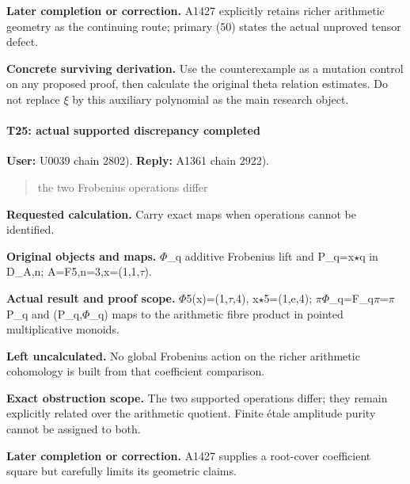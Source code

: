 \textbf{Later completion or correction.} A1427 explicitly retains richer
arithmetic geometry as the continuing route; primary (50) states the
actual unproved tensor defect.

\textbf{Concrete surviving derivation.} Use the counterexample as a
mutation control on any proposed proof, then calculate the original
theta relation estimates. Do not replace
\allowbreak{}\ensuremath{ξ}\allowbreak{} by this auxiliary polynomial as
the main research object.

\paragraph{T25: actual supported discrepancy
completed}\label{t25-actual-supported-discrepancy-completed}

\textbf{User:} U0039
\protect{} chain 2802).
\textbf{Reply:} A1361
\protect{} chain 2922).

\begin{quote}
the two Frobenius operations differ
\end{quote}

\textbf{Requested calculation.} Carry exact maps when operations cannot
be identified.

\textbf{Original objects and maps.}
\allowbreak{}\ensuremath{Φ}\allowbreak{}\_q additive Frobenius lift and
P\_q=x\allowbreak{}\ensuremath{⋆}\allowbreak{}q in D\_A,n;
A=F5,n=3,x=(1,1,\allowbreak{}\ensuremath{τ}\allowbreak{}).

\textbf{Actual result and proof scope.}
\allowbreak{}\ensuremath{Φ}\allowbreak{}5(x)=(1,\allowbreak{}\ensuremath{τ}\allowbreak{},4),
x\allowbreak{}\ensuremath{⋆}\allowbreak{}5=(1,e,4);
\allowbreak{}\ensuremath{π}\allowbreak{}\allowbreak{}\ensuremath{Φ}\allowbreak{}\_q=F\_q\allowbreak{}\ensuremath{π}\allowbreak{}=\allowbreak{}\ensuremath{π}\allowbreak{}P\_q
and (P\_q,\allowbreak{}\ensuremath{Φ}\allowbreak{}\_q) maps to the
arithmetic fibre product in pointed multiplicative monoids.

\textbf{Left uncalculated.} No global Frobenius action on the richer
arithmetic cohomology is built from that coefficient comparison.

\textbf{Exact obstruction scope.} The two supported operations differ;
they remain explicitly related over the arithmetic quotient. Finite
étale amplitude purity cannot be assigned to both.

\textbf{Later completion or correction.} A1427 supplies a root-cover
coefficient square but carefully limits its geometric claims.

